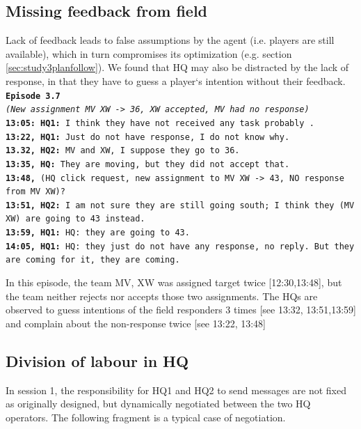 \subsection{Missing feedback from field}
Lack of feedback leads to false assumptions by the agent (i.e. players are still available), which in turn compromises its optimization (e.g. section \ref{sec:study3planfollow}). We found that HQ may also be distracted by the lack of response, in that they have to guess a player`s intention without their feedback. \\

\noindent\texttt{\textbf{Episode 3.7}\\
\emph{(New assignment MV XW -> 36, XW accepted, MV had no response)}\\
\textbf{13:05: HQ1: } I think they have not received any task probably . \\
\textbf{13:22, HQ1: } Just do not have response, I do not know why.  \\
\textbf{13.32, HQ2: } MV and XW, I suppose they go to 36. \\
\textbf{13:35, HQ: } They are moving, but they did not accept that. \\
\textbf{13:48, } (HQ click request, new assignment to MV XW -> 43, NO response from MV XW)?\\
\textbf{13:51, HQ2: } I am not sure they are still going south; I think they (MV XW) are going to 43 instead. \\
\textbf{13:59, HQ1: } HQ: they are going to 43.\\
\textbf{14:05, HQ1: } HQ: they just do not have any response, no reply. But they are coming for it, they are coming. \\
}

In this episode, the team MV, XW was assigned target twice [12:30,13:48], but the team neither rejects nor accepts those two assignments. The HQs are observed to guess intentions of the field responders 3 times [see 13:32, 13:51,13:59] and complain about the non-response twice [see 13:22, 13:48]

\subsection{Division of labour in HQ}

In session 1, the responsibility for HQ1 and HQ2 to send messages are not fixed as originally designed, but dynamically negotiated between the two HQ operators. The following fragment is a typical case of negotiation.\\

